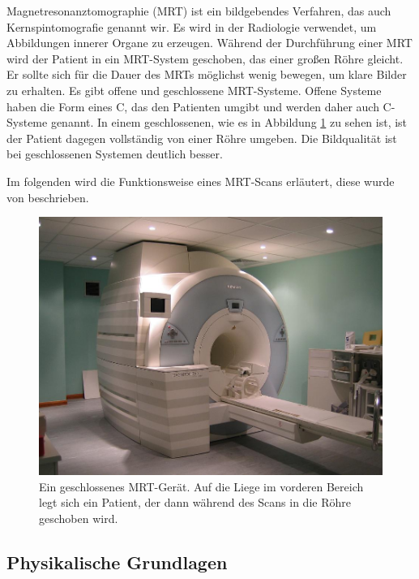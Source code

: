 Magnetresonanztomographie (MRT) ist ein bildgebendes Verfahren, das auch Kernspintomografie genannt wir. Es wird in der Radiologie verwendet, um Abbildungen innerer Organe zu erzeugen. Während der Durchführung einer MRT wird der Patient in ein MRT-System geschoben, das einer großen Röhre gleicht. Er sollte sich für die Dauer des MRTs möglichst wenig bewegen, um klare Bilder zu erhalten.
Es gibt offene und geschlossene MRT-Systeme. Offene Systeme haben die Form eines C, das den Patienten umgibt und werden daher auch C-Systeme genannt. In einem geschlossenen, wie es in Abbildung \ref{img:mri} zu sehen ist, ist der Patient dagegen vollständig von einer Röhre umgeben. Die Bildqualität ist bei geschlossenen Systemen deutlich besser.

Im folgenden wird die Funktionsweise eines MRT-Scans erläutert, diese wurde von \cite{weishaupt09} beschrieben.

\begin{figure}[!htb]
	\centering
	\includegraphics[width=0.5\linewidth]{images/mri.jpg}
	\caption{Ein geschlossenes MRT-Gerät. Auf die Liege im vorderen Bereich legt sich ein Patient, der dann während des Scans in die Röhre geschoben wird. }
	\label{img:mri}
\end{figure}
\FloatBarrier

\subsection{Physikalische Grundlagen}

